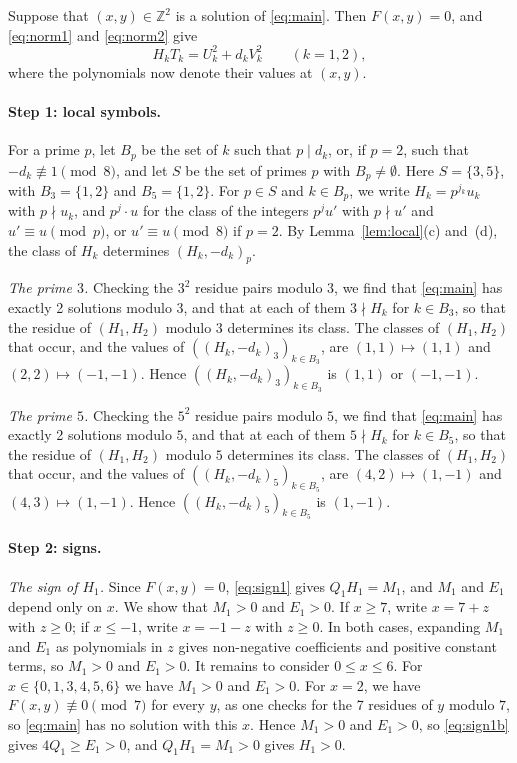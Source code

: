 \documentclass[11pt]{article}
\newcommand{\Z}{\mathbb{Z}}
\begin{document}
Suppose that $(x,y)\in\Z^2$ is a solution of \eqref{eq:main}. Then $F(x,y)=0$, and \eqref{eq:norm1} and \eqref{eq:norm2} give
\begin{equation}\label{eq:HT}
H_kT_k=U_k^2+d_kV_k^2\qquad(k=1,2),
\end{equation}
where the polynomials now denote their values at $(x,y)$.

\paragraph{Step 1: local symbols.} For a prime $p$, let $B_p$ be the set of $k$ such that $p\mid d_k$, or, if $p=2$, such that $-d_k\not\equiv1\pmod8$, and let $S$ be the set of primes $p$ with $B_p\neq\emptyset$. Here $S=\{3,5\}$, with $B_{3}=\{1,2\}$ and $B_{5}=\{1,2\}$. For $p\in S$ and $k\in B_p$, we write $H_k=p^{j_k}u_k$ with $p\nmid u_k$, and $p^j\cdot u$ for the class of the integers $p^ju'$ with $p\nmid u'$ and $u'\equiv u\pmod p$, or $u'\equiv u\pmod 8$ if $p=2$. By Lemma~\ref{lem:local}(c) and~(d), the class of $H_k$ determines $(H_k,-d_k)_p$.

\emph{The prime $3$.} Checking the $3^2$ residue pairs modulo $3$, we find that \eqref{eq:main} has exactly 2 solutions modulo $3$, and that at each of them $3\nmid H_k$ for $k\in B_{3}$, so that the residue of $(H_{1},H_{2})$ modulo $3$ determines its class. The classes of $(H_{1},H_{2})$ that occur, and the values of $((H_k,-d_k)_{3})_{k\in B_{3}}$, are $(1,1)\mapsto(1,1)$ and $(2,2)\mapsto(-1,-1)$. Hence $((H_k,-d_k)_{3})_{k\in B_{3}}$ is $(1,1)$ or $(-1,-1)$.

\emph{The prime $5$.} Checking the $5^2$ residue pairs modulo $5$, we find that \eqref{eq:main} has exactly 2 solutions modulo $5$, and that at each of them $5\nmid H_k$ for $k\in B_{5}$, so that the residue of $(H_{1},H_{2})$ modulo $5$ determines its class. The classes of $(H_{1},H_{2})$ that occur, and the values of $((H_k,-d_k)_{5})_{k\in B_{5}}$, are $(4,2)\mapsto(1,-1)$ and $(4,3)\mapsto(1,-1)$. Hence $((H_k,-d_k)_{5})_{k\in B_{5}}$ is $(1,-1)$.

\paragraph{Step 2: signs.} \emph{The sign of $H_{1}$.} Since $F(x,y)=0$, \eqref{eq:sign1} gives $Q_{1}H_{1}=M_{1}$, and $M_{1}$ and $E_{1}$ depend only on $x$. We show that $M_{1}>0$ and $E_{1}>0$. If $x\geq7$, write $x=7+z$ with $z\geq0$; if $x\leq-1$, write $x=-1-z$ with $z\geq0$. In both cases, expanding $M_{1}$ and $E_{1}$ as polynomials in $z$ gives non-negative coefficients and positive constant terms, so $M_{1}>0$ and $E_{1}>0$. It remains to consider $0\leq x\leq6$. For $x\in\{0,1,3,4,5,6\}$ we have $M_{1}>0$ and $E_{1}>0$. For $x=2$, we have $F(x,y)\not\equiv0\pmod{7}$ for every $y$, as one checks for the 7 residues of $y$ modulo $7$, so \eqref{eq:main} has no solution with this $x$. Hence $M_{1}>0$ and $E_{1}>0$, so \eqref{eq:sign1b} gives $4Q_{1}\geq E_{1}>0$, and $Q_{1}H_{1}=M_{1}>0$ gives $H_{1}>0$.
\end{document}
